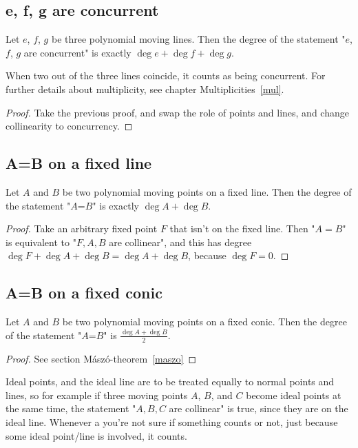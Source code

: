 \documentclass[a4paper]{article}
\begin{document}
\subsection{e, f, g are concurrent}

\begin{theorem}
    Let $e$, $f$, $g$ be three polynomial moving lines. Then the degree of the statement "$e$, $f$, $g$ are concurrent" is exactly $\deg e+ \deg f+ \deg g$.
\end{theorem}
\begin{remark}
    When two out of the three lines coincide, it counts as being concurrent. For further details about multiplicity, see chapter Multiplicities~\ref{mul}.
\end{remark}
\begin{proof}
    Take the previous proof, and swap the role of points and lines, and change collinearity to concurrency.
\end{proof}

\subsection{A=B on a fixed line}

\begin{theorem}\label{degab}
    Let $A$ and $B$ be two polynomial moving points on a fixed line. Then the degree of the statement "$A$=$B$" is exactly $\deg A+ \deg B$.
\end{theorem}
\begin{proof}
    Take an arbitrary fixed point $F$ that isn't on the fixed line. Then "$A=B$" is equivalent to "$F, A, B$ are collinear", and this has degree $\deg F+\deg A+\deg B=\deg A+\deg B$, because $\deg F=0$.
\end{proof}

\subsection{A=B on a fixed conic}

\begin{theorem}
    Let $A$ and $B$ be two polynomial moving points on a fixed conic. Then the degree of the statement "$A$=$B$" is $\frac{\deg A+ \deg B}{2}$.
\end{theorem}
\begin{proof}
    See section Mászó-theorem~\ref{maszo}
\end{proof}

\begin{remark}
    Ideal points, and the ideal line are to be treated equally to normal points and lines, so for example if three moving points $A$, $B$, and $C$ become ideal points at the same time, the statement "$A, B, C$ are collinear" is true, since they are on the ideal line.
    Whenever a you're not sure if something counts or not, just because some ideal point/line is involved, it counts.
\end{remark}
\end{document}
